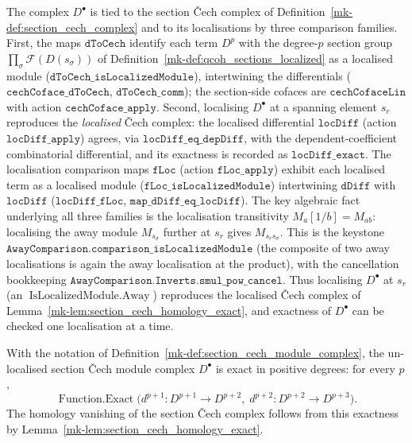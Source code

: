 \begin{definition}
  The complex \(D^\bullet\) is tied to the section {\v C}ech complex of
  Definition~\ref{mk-def:section_cech_complex} and to its localisations by three
  comparison families. First, the maps \(\mathtt{dToCech}\) identify each term
  \(D^p\) with the degree-\(p\) section group
  \(\prod_\sigma \mathcal{F}(D(s_\sigma))\) of
  Definition~\ref{mk-def:qcoh_sections_localized} as a localised module
  (\(\mathtt{dToCech\_isLocalizedModule}\)), intertwining the differentials
  (\(\mathtt{cechCoface\_dToCech}\), \(\mathtt{dToCech\_comm}\)); the section-side
  cofaces are \(\mathtt{cechCofaceLin}\) with action \(\mathtt{cechCoface\_apply}\).
  Second, localising \(D^\bullet\) at a spanning element \(s_r\) reproduces the
  \emph{localised} {\v C}ech complex: the localised differential \(\mathtt{locDiff}\)
  (action \(\mathtt{locDiff\_apply}\)) agrees, via
  \(\mathtt{locDiff\_eq\_depDiff}\), with the dependent-coefficient combinatorial
  differential, and its exactness is recorded as \(\mathtt{locDiff\_exact}\). The
  localisation comparison maps \(\mathtt{fLoc}\) (action \(\mathtt{fLoc\_apply}\))
  exhibit each localised term as a localised module
  (\(\mathtt{fLoc\_isLocalizedModule}\)) intertwining \(\mathtt{dDiff}\) with
  \(\mathtt{locDiff}\) (\(\mathtt{locDiff\_fLoc}\), \(\mathtt{map\_dDiff\_eq\_locDiff}\)).
  The key algebraic fact underlying all three families is the localisation
  transitivity \(M_a[1/b] = M_{ab}\): localising the away module \(M_{s_\sigma}\)
  further at \(s_r\) gives \(M_{s_r s_\sigma}\). This is the keystone
  \(\mathtt{AwayComparison.comparison\_isLocalizedModule}\) (the composite of two away
  localisations is again the away localisation at the product), with the cancellation
  bookkeeping \(\mathtt{AwayComparison.Inverts.smul\_pow\_cancel}\). Thus localising
  \(D^\bullet\) at \(s_r\) (an \(\operatorname{IsLocalizedModule.Away}\)) reproduces
  the localised Čech complex of Lemma~\ref{mk-lem:section_cech_homology_exact}, and
  exactness of \(D^\bullet\) can be checked one localisation at a time.
\end{definition}

\begin{lemma}\label{mk-lem:section_cech_module_exact}
  \leanok

  With the notation of Definition~\ref{mk-def:section_cech_module_complex}, the
  un-localised section {\v C}ech module complex \(D^\bullet\) is exact in positive
  degrees: for every \(p\),
  \[
    \operatorname{Function.Exact}\bigl(d^{p+1} : D^{p+1} \to D^{p+2},\;
      d^{p+2} : D^{p+2} \to D^{p+3}\bigr).
  \]
  The homology vanishing of the section {\v C}ech complex follows from this exactness
  by Lemma~\ref{mk-lem:section_cech_homology_exact}.
\end{lemma}

